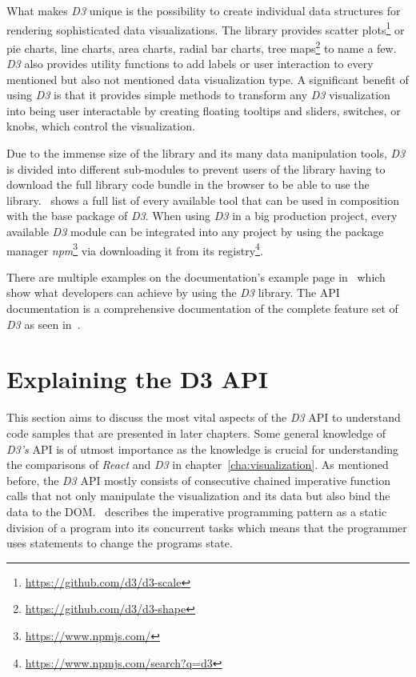 What makes \emph{D3} unique is the possibility to create individual data structures for rendering sophisticated data visualizations. The library provides scatter plots\footnote{\url{https://github.com/d3/d3-scale}} or pie charts, line charts, area charts, radial bar charts, tree maps\footnote{\url{https://github.com/d3/d3-shape}} to name a few. \emph{D3} also provides utility functions to add labels or user interaction to every mentioned but also not mentioned data visualization type. A significant benefit of using \emph{D3} is that it provides simple methods to transform any \emph{D3} visualization into being user interactable by creating floating tooltips and sliders, switches, or knobs, which control the visualization.

Due to the immense size of the library and its many data manipulation tools, \emph{D3} is divided into different sub-modules to prevent users of the library having to download the full library code bundle in the browser to be able to use the library.~\cite{D3Github} shows a full list of every available tool that can be used in composition with the base package of \emph{D3}. When using \emph{D3} in a big production project, every available \emph{D3} module can be integrated into any project by using the package manager \emph{npm}\footnote{\url{https://www.npmjs.com/}} via downloading it from its registry\footnote{\url{https://www.npmjs.com/search?q=d3}}.

\begin{emergency}{1em}
There are multiple examples on the documentation's example page in~\cite{D3Examples} which show what developers can achieve by using the \emph{D3} library. The API documentation is a comprehensive documentation of the complete feature set of \emph{D3} as seen in~\cite{D3Github}. %
\end{emergency}


\section{Explaining the D3 API} 

This section aims to discuss the most vital aspects of the \emph{D3} API to understand code samples that are presented in later chapters. Some general knowledge of \emph{D3's} API is of utmost importance as the knowledge is crucial for understanding the comparisons of \emph{React} and \emph{D3} in chapter~\ref{cha:visualization}. As mentioned before, the \emph{D3} API mostly consists of consecutive chained imperative function calls that not only manipulate the visualization and its data but also bind the data to the DOM.~\cite[p.\ 625]{prgLngDesignImpl} describes the imperative programming pattern as a static division of a program into its concurrent tasks which means that the programmer uses statements to change the programs state. 

